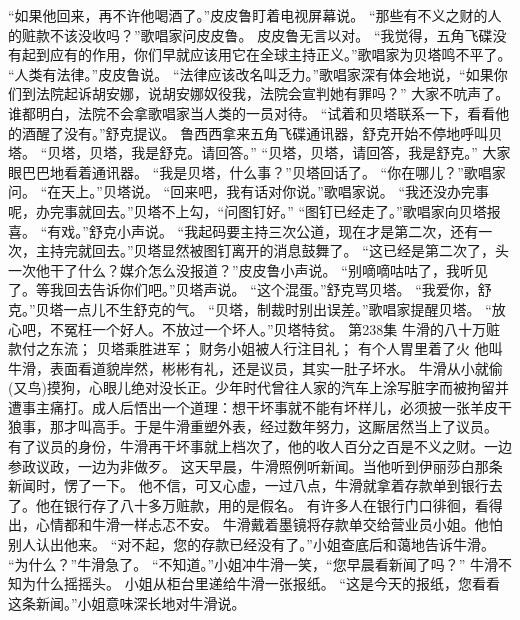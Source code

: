 \documentclass[a4paper,12pt,UTF8,twoside]{ctexbook}
\begin{document}
        “如果他回来，再不许他喝酒了。”皮皮鲁盯着电视屏幕说。  
        “那些有不义之财的人的赃款不该没收吗？”歌唱家问皮皮鲁。  
        皮皮鲁无言以对。  
        “我觉得，五角飞碟没有起到应有的作用，你们早就应该用它在全球主持正义。”歌唱家为贝塔鸣不平了。  
        “人类有法律。”皮皮鲁说。  
        “法律应该改名叫乏力。”歌唱家深有体会地说，“如果你们到法院起诉胡安娜，说胡安娜奴役我，法院会宣判她有罪吗？”  
        大家不吭声了。谁都明白，法院不会拿歌唱家当人类的一员对待。  
        “试着和贝塔联系一下，看看他的酒醒了没有。”舒克提议。   
        鲁西西拿来五角飞碟通讯器，舒克开始不停地呼叫贝塔。  
        “贝塔，贝塔，我是舒克。请回答。”  
        “贝塔，贝塔，请回答，我是舒克。”  
        大家眼巴巴地看着通讯器。  
        “我是贝塔，什么事？”贝塔回话了。  
        “你在哪儿？”歌唱家问。  
        “在天上。”贝塔说。  
        “回来吧，我有话对你说。”歌唱家说。  
        “我还没办完事呢，办完事就回去。”贝塔不上勾，“问图钉好。”  
        “图钉已经走了。”歌唱家向贝塔报喜。  
        “有戏。”舒克小声说。  
        “我起码要主持三次公道，现在才是第二次，还有一次，主持完就回去。”贝塔显然被图钉离开的消息鼓舞了。  
        “这已经是第二次了，头一次他干了什么？媒介怎么没报道？”皮皮鲁小声说。  
        “别嘀嘀咕咕了，我听见了。等我回去告诉你们吧。”贝塔声说。  
        “这个混蛋。”舒克骂贝塔。  
        “我爱你，舒克。”贝塔一点儿不生舒克的气。        
        “贝塔，制裁时别出误差。”歌唱家提醒贝塔。  
        “放心吧，不冤枉一个好人。不放过一个坏人。”贝塔特贫。          第238集  
        牛滑的八十万赃款付之东流；  
        贝塔乘胜进军；  
        财务小姐被人行注目礼；  
        有个人胃里着了火    
        他叫牛滑，表面看道貌岸然，彬彬有礼，还是议员，其实一肚子坏水。  
        牛滑从小就偷(又鸟)摸狗，心眼儿绝对没长正。少年时代曾往人家的汽车上涂写脏字而被拘留并遭事主痛打。成人后悟出一个道理：想干坏事就不能有坏样儿，必须披一张羊皮干狼事，那才叫高手。于是牛滑重塑外表，经过数年努力，这厮居然当上了议员。  
        有了议员的身份，牛滑再干坏事就上档次了，他的收人百分之百是不义之财。一边参政议政，一边为非做歹。  
        这天早晨，牛滑照例听新闻。当他听到伊丽莎白那条新闻时，愣了一下。  
        他不信，可又心虚，一过八点，牛滑就拿着存款单到银行去了。他在银行存了八十多万赃款，用的是假名。  
        有许多人在银行门口徘徊，看得出，心情都和牛滑一样忐忑不安。  
        牛滑戴着墨镜将存款单交给营业员小姐。他怕别人认出他来。  
        “对不起，您的存款已经没有了。”小姐查底后和蔼地告诉牛滑。  
        “为什么？”牛滑急了。  
        “不知道。”小姐冲牛滑一笑，“您早晨看新闻了吗？”  
        牛滑不知为什么摇摇头。  
        小姐从柜台里递给牛滑一张报纸。  
        “这是今天的报纸，您看看这条新闻。”小姐意味深长地对牛滑说。  
\end{document}
